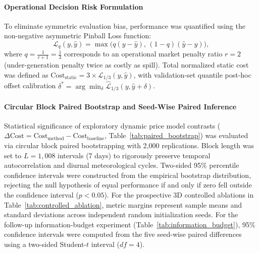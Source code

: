 \paragraph*{Operational Decision Risk Formulation}
To eliminate symmetric evaluation bias, performance was quantified using the non-negative asymmetric Pinball Loss function:
\begin{equation}
\mathcal{L}_q(y, \hat{y}) = \max\big( q(y - \hat{y}),\, (1-q)(\hat{y} - y) \big),
\end{equation}
where $q = \frac{1}{r+1} = \frac{1}{3}$ corresponds to an operational market penalty ratio $r=2$ (under-generation penalty twice as costly as spill). Total normalized static cost was defined as $\text{Cost}_{\text{static}} = 3 \times \mathcal{L}_{1/3}(y, \hat{y})$, with validation-set quantile post-hoc offset calibration $\delta^* = \arg\min_\delta \hat{\mathcal{L}}_{1/3}(y, \hat{y} + \delta)$.

\paragraph*{Circular Block Paired Bootstrap and Seed-Wise Paired Inference}
Statistical significance of exploratory dynamic price model contrasts ($\Delta \text{Cost} = \text{Cost}_{\text{method}} - \text{Cost}_{\text{baseline}}$, Table~\ref{tab:paired_bootstrap}) was evaluated via circular block paired bootstrapping with 2,000 replications. Block length was set to $L = 1,008$ intervals (7 days) to rigorously preserve temporal autocorrelation and diurnal meteorological cycles. Two-sided 95\% percentile confidence intervals were constructed from the empirical bootstrap distribution, rejecting the null hypothesis of equal performance if and only if zero fell outside the confidence interval ($p < 0.05$). For the prospective 3D controlled ablations in Table~\ref{tab:controlled_ablation}, metric margins represent sample means and standard deviations across independent random initialization seeds. For the follow-up information-budget experiment (Table~\ref{tab:information_budget}), 95\% confidence intervals were computed from the five seed-wise paired differences using a two-sided Student-$t$ interval ($df = 4$).
